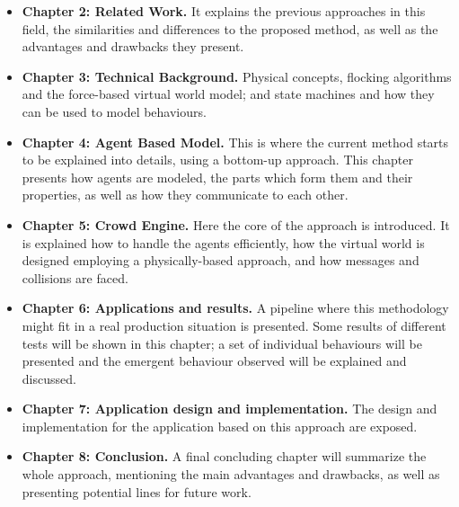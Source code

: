 \begin{itemize}

\item {{\bf Chapter 2: Related Work.} It explains the previous approaches in this field, the similarities and differences to the proposed method, as well as the advantages and drawbacks they present.}

\item {{\bf Chapter 3: Technical Background.} Physical concepts, flocking algorithms and the force-based virtual world model; and state machines and how they can be used to model behaviours.}

\item {{\bf Chapter 4: Agent Based Model.} This is where the current method starts to be explained into details, using a bottom-up approach. This chapter presents how agents are modeled, the parts which form them and their properties, as well as how they communicate to each other.}

\item{{\bf Chapter 5: Crowd Engine.} Here the core of the approach is introduced. It is explained how to handle the agents efficiently, how the virtual world is designed employing a physically-based approach, and how messages and collisions are faced.}

\item {{\bf Chapter 6: Applications and results.} A pipeline where this methodology might fit in a real production situation is presented. Some results of different tests will be shown in this chapter; a set of individual behaviours will be presented and the emergent behaviour observed will be explained and discussed.}

\item{{\bf Chapter 7: Application design and implementation.} The design and implementation for the application based on this approach are exposed.}

\item {{\bf Chapter 8: Conclusion.} A final concluding chapter will summarize the whole approach, mentioning the main advantages and drawbacks, as well as presenting potential lines for future work.}

\end{itemize}

\ifx\isEmbedded\undefined


\pagebreak

\fi

